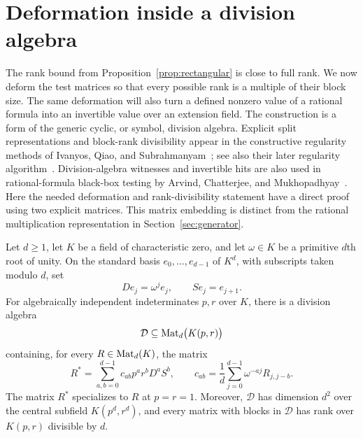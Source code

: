 \section{Deformation inside a division algebra}\label{sec:division}

The rank bound from Proposition~\ref{prop:rectangular} is close to full
rank.  We now deform the test matrices so that every possible rank is a
multiple of their block size.  The same deformation will also turn a
defined nonzero value of a rational formula into an invertible value over
an extension field.
The construction is a form of the generic cyclic, or symbol,
division algebra. Explicit split representations and block-rank
divisibility appear in the constructive regularity methods of
Ivanyos, Qiao, and Subrahmanyam~\citep[Sections~4.3 and~5.2 of the
preprint]{IQS17}; see also their later regularity
algorithm~\citep[Section~4]{IQS18}.
Division-algebra witnesses and invertible hits are also used in
rational-formula black-box testing by Arvind, Chatterjee, and
Mukhopadhyay~\citep{ACM22,ACM25}.
Here the needed deformation and rank-divisibility statement have
a direct proof using two explicit matrices. This matrix embedding
is distinct from the rational multiplication representation in
Section~\ref{sec:generator}.

\begin{lemma}\label{lem:division-lift}
Let $d\geq 1$, let $K$ be a field of characteristic zero, and let
$\omega\in K$ be a primitive $d$th root of unity.  On the standard basis
$e_0,\ldots,e_{d-1}$ of $K^d$, with subscripts taken modulo $d$, set
\[
  De_j=\omega^j e_j,
  \qquad Se_j=e_{j+1}.
\]
For algebraically independent indeterminates $p,r$ over $K$, there is a
division algebra
\[
  \mathcal D\subseteq\operatorname{Mat}_d\bigl(K(p,r)\bigr)
\]
containing, for every $R\in\operatorname{Mat}_d(K)$, the matrix
\begin{equation}\label{eq:division-lift}
  R^*=\sum_{a,b=0}^{d-1}c_{ab}p^a r^bD^aS^b,
  \qquad
  c_{ab}=\frac1d\sum_{j=0}^{d-1}\omega^{-aj}R_{j,j-b}.
\end{equation}
The matrix $R^*$ specializes to $R$ at $p=r=1$.
Moreover, $\mathcal D$ has dimension $d^2$ over the central subfield
$K(p^d,r^d)$, and every matrix with blocks in $\mathcal D$ has rank over
$K(p,r)$ divisible by $d$.
\end{lemma}


